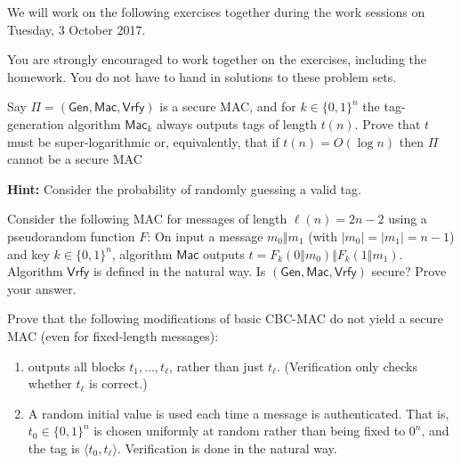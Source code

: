 \documentclass[a4paper,10pt,landscape,twocolumn]{scrartcl}
\newcommand\worksession{Tuesday, 3 October 2017}
\begin{document}
\problems

{\sffamily\noindent
We will work on the following exercises together during the work sessions on \worksession.

You are strongly encouraged to work together on the exercises, including the homework. You do not have to hand in solutions to these problem sets.}

\begin{exercise}
Say $\Pi=(\mathsf{Gen},\mathsf{Mac},\mathsf{Vrfy})$ is a secure MAC, and for $k\in\{0,1\}^n$ the tag-generation algorithm $\mathsf{Mac}_k$ always outputs tags of length $t(n)$. Prove that $t$ must be super-logarithmic or, equivalently, that if $t(n)=O(\log n)$ then $\Pi$ cannot be a secure MAC

\textbf{Hint:} Consider the probability of randomly guessing a valid tag.
\end{exercise}

\begin{exercise}
Consider the following MAC for messages of length $\ell(n)=2n-2$ using a pseudorandom function $F$: On input a message $m_0\Vert m_1$ (with $|m_0|=|m_1|=n-1$) and key $k\in\{0,1\}^n$, algorithm $\mathsf{Mac}$ outputs $t=F_k(0\Vert m_0)\Vert F_k(1\Vert m_1)$. Algorithm $\mathsf{Vrfy}$ is defined in the natural way. Is $(\mathsf{Gen},\mathsf{Mac},\mathsf{Vrfy})$ secure? Prove your answer.
\end{exercise}

\begin{exercise}
  Prove that the following modifications of basic CBC-MAC do not yield a
secure MAC (even for fixed-length messages):
\begin{enumerate}
\item \mac outputs all blocks $t_1, \ldots , t_\ell$, rather than just $t_\ell$. (Verification only checks whether $t_\ell$ is correct.)
\item A random initial value is used each time a message is authenticated. That is, $t_0 \in \{0, 1\}^n$ is chosen uniformly at random rather than being fixed to $0^n$, and the tag is $\langle t_0, t_\ell \rangle$. Verification is done in the natural way.
\end{enumerate}
\end{exercise}
\end{document}
